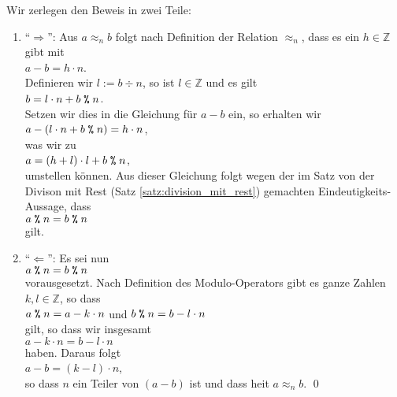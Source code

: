 \proof
Wir zerlegen den Beweis in zwei Teile:
\begin{enumerate}
\item ``$\Rightarrow$'':
      Aus $a \approx_n b$ folgt nach Definition der Relation $\approx_n$, dass es ein $h \in \mathbb{Z}$ gibt mit
      \\[0.2cm]
      \hspace*{1.3cm}
      $a - b = h \cdot n$.
      \\[0.2cm]
      Definieren wir $l := b \div n$, so ist $l \in \mathbb{Z}$ und es gilt
      \\[0.2cm]
      \hspace*{1.3cm}
      $b = l \cdot n + b \;\texttt{\%}\; n$.
      \\[0.2cm]
      Setzen wir dies in die Gleichung f\"{u}r $a - b$ ein, so erhalten wir
      \\[0.2cm]
      \hspace*{1.3cm}
      $a - (l \cdot n + b \;\texttt{\%}\; n) = h \cdot n$,
      \\[0.2cm]
      was wir zu
      \\[0.2cm]
      \hspace*{1.3cm}
      $a = (h + l) \cdot l + b \;\texttt{\%}\; n$,
      \\[0.2cm]
      umstellen k\"{o}nnen.  Aus dieser Gleichung folgt wegen der im Satz von der Divison mit Rest 
      (Satz \ref{satz:division_mit_rest})
      gemachten Eindeutigkeits-Aussage, dass
      \\[0.2cm]
      \hspace*{1.3cm}
      $a \;\texttt{\%}\; n = b \;\texttt{\%}\; n$
      \\[0.2cm]
      gilt. \checkmark
\item ``$\Leftarrow$'':
      Es sei nun 
      \\[0.2cm]
      \hspace*{1.3cm}
      $a \;\texttt{\%}\; n = b \;\texttt{\%}\; n$ 
      \\[0.2cm]
      vorausgesetzt. Nach Definition des Modulo-Operators gibt es ganze Zahlen $k,l \in
      \mathbb{Z}$, so dass 
      \\[0.2cm]
      \hspace*{1.3cm}
      $a \;\texttt{\%}\; n = a - k \cdot n$ \quad und \quad
      $b \;\texttt{\%}\; n = b - l \cdot n$ 
      \\[0.2cm]
      gilt, so dass wir insgesamt
      \\[0.2cm]
      \hspace*{1.3cm}
      $a - k \cdot n = b - l \cdot n$
      \\[0.2cm]
      haben.   Daraus folgt
      \\[0.2cm]
      \hspace*{1.3cm}
      $a - b = (k - l) \cdot n$,
      \\[0.2cm]
      so dass $n$ ein Teiler von $(a- b)$ ist und dass hei\3t $a \approx_n b$. \checkmark \qed
\end{enumerate}

